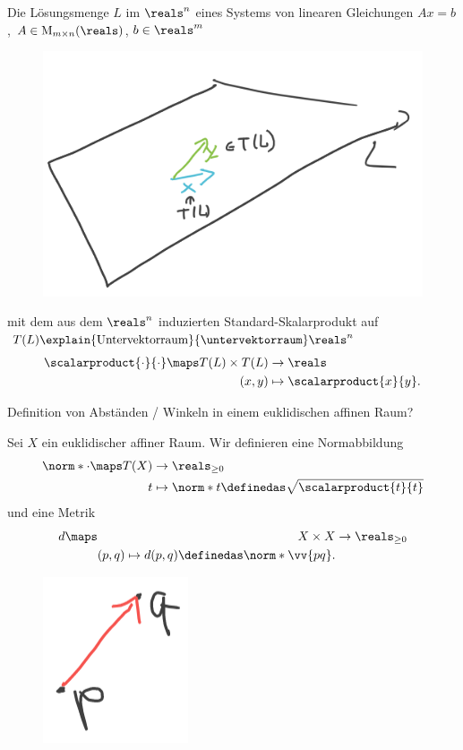 \begin{beispiel}
  Die Lösungsmenge \( L \) im \( \reals^n \) eines Systems von linearen Gleichungen \( Ax=b \), \( A\in \Mat_{m \times n}(\reals) \), \( b\in \reals^m \)
  \begin{figure}[H]
    \centering
    \includegraphics[width=0.5\linewidth]{figures/hyperebene_beispiel_euklidischer_affiner_raum}
    \label{fig:hyperebene_beispiel_euklidischer_affiner_raum}
  \end{figure}
  mit dem aus dem \( \reals^n \) induzierten Standard-Skalarprodukt auf \( T(L)\explain{\text{Untervektorraum}}{\untervektorraum}\reals^n \)
  \begin{equation*}
    \scalarproduct{\cdot}{\cdot}\maps \begin{aligned}[t]
      T(L)\times T(L)&\to \reals\\
      (x,y) &\mapsto \scalarproduct{x}{y}.
    \end{aligned}
  \end{equation*}
\end{beispiel}
\begin{frage*}
  Definition von Abständen / Winkeln in einem euklidischen affinen Raum?
\end{frage*}
\begin{definition}
  Sei \( X \) ein euklidischer affiner Raum. Wir definieren eine Normabbildung
  \begin{equation*}
    \norm*{\cdot}\maps \begin{aligned}[t]
      T(X)&\to \reals_{\geq 0}\\
      t&\mapsto \norm*{t}\definedas \sqrt{\scalarproduct{t}{t}}
    \end{aligned}
  \end{equation*}
  und eine Metrik
  \begin{equation*}
    d\maps \begin{aligned}[t]
      X\times X&\to \reals_{\geq 0}\\
      (p,q)\mapsto d(p,q)\definedas \norm*{\vv{pq}}.
    \end{aligned}
  \end{equation*}
  \begin{figure}[H]
    \centering
    \includegraphics[width=0.2\linewidth]{figures/metrik_auf_affinem_raum_visualisierung}
    \label{fig:metrik_auf_affinem_raum_visualisierung}
  \end{figure}
\end{definition}
